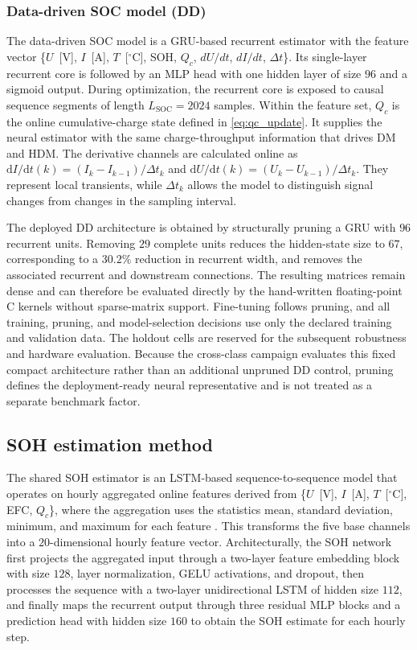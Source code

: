 \documentclass[review,nopreprintline]{elsarticle}
\begin{document}
\subsubsection*{Data-driven SOC model (DD)}
The data-driven SOC model is a GRU-based recurrent estimator with the feature vector \{$U$~[V], $I$~[A], $T$~[$^\circ$C], SOH, $Q_c$, $dU/dt$, $dI/dt$, $\Delta t$\}. Its single-layer recurrent core is followed by an MLP head with one hidden layer of size $96$ and a sigmoid output. During optimization, the recurrent core is exposed to causal sequence segments of length $L_{\mathrm{SOC}}=2024$ samples. Within the feature set, $Q_c$ is the online cumulative-charge state defined in \eqref{eq:qc_update}. It supplies the neural estimator with the same charge-throughput information that drives DM and HDM. The derivative channels are calculated online as $\mathrm{d}I/\mathrm{d}t(k)=(I_k-I_{k-1})/\Delta t_k$ and $\mathrm{d}U/\mathrm{d}t(k)=(U_k-U_{k-1})/\Delta t_k$. They represent local transients, while $\Delta t_k$ allows the model to distinguish signal changes from changes in the sampling interval.

The deployed DD architecture is obtained by structurally pruning a GRU with $96$ recurrent units. Removing $29$ complete units reduces the hidden-state size to $67$, corresponding to a $30.2\%$ reduction in recurrent width, and removes the associated recurrent and downstream connections. The resulting matrices remain dense and can therefore be evaluated directly by the hand-written floating-point C kernels without sparse-matrix support. Fine-tuning follows pruning, and all training, pruning, and model-selection decisions use only the declared training and validation data. The holdout cells are reserved for the subsequent robustness and hardware evaluation. Because the cross-class campaign evaluates this fixed compact architecture rather than an additional unpruned DD control, pruning defines the deployment-ready neural representative and is not treated as a separate benchmark factor.

\subsection{SOH estimation method}
The shared SOH estimator is an LSTM-based sequence-to-sequence model that operates on hourly aggregated online features derived from \{$U$~[V], $I$~[A], $T$~[$^\circ$C], EFC, $Q_c$\}, where the aggregation uses the statistics mean, standard deviation, minimum, and maximum for each feature \cite{Embedded_AI_SOH_badData,gouEnsembleLearningBasedDataDriven2021,liOnlineCapacityEstimation2021,rzepkaNeuralNetworkArchitecture2023a}. This transforms the five base channels into a $20$-dimensional hourly feature vector. Architecturally, the SOH network first projects the aggregated input through a two-layer feature embedding block with size $128$, layer normalization, GELU activations, and dropout, then processes the sequence with a two-layer unidirectional LSTM of hidden size $112$, and finally maps the recurrent output through three residual MLP blocks and a prediction head with hidden size $160$ to obtain the SOH estimate for each hourly step.
\end{document}
